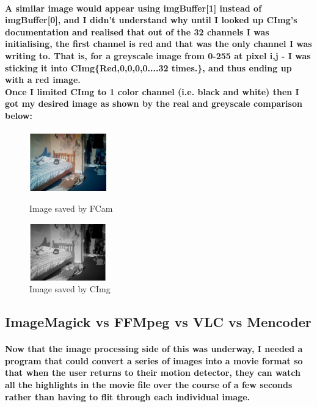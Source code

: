 \documentclass[11pt]{article} %
\begin{document}
\paragraph{
A similar image would appear using imgBuffer[1] instead of imgBuffer[0], and I didn't understand why until I looked up CImg's documentation and realised that out of the 32 channels I was initialising, the first channel is red and that was the only channel I was writing to.
That is, for a greyscale image from 0-255 at pixel i,j - I was sticking it into CImg\{Red,0,0,0,0....32 times.\}, and thus ending up with a red image.
\\
Once I limited CImg to 1 color channel (i.e. black and white) then I got my desired image as shown by the real and greyscale comparison below:
}
\begin{figure}
	\vspace{-20pt}
	\begin{center}
		\includegraphics[width=0.3\textwidth]{images/realbuffer2}
	\end{center}
	\vspace{-20pt}
	\caption{Image saved by FCam}
	\vspace{10pt}
	\begin{center}
		\includegraphics[width=0.3\textwidth]{images/blackbuffer3}
	\end{center}
	\caption{Image saved by CImg}
	\vspace{-20pt}
\end{figure}

\subsection{ImageMagick vs FFMpeg vs VLC vs Mencoder}
\paragraph{Now that the image processing side of this was underway, I needed a program that could convert a series of images into a movie format so that when the user returns to their motion detector, they can watch all the highlights in the movie file over the course of a few seconds rather than having to flit through each individual image.
}
\end{document}
